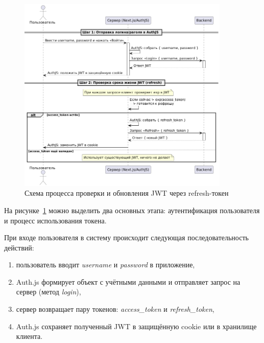 \begin{figure}[h]
    \centering
    \includegraphics[width=0.9\textwidth]{static/diagrams/AuthRefresh.png}
    \caption{Схема процесса проверки и обновления JWT через refresh-токен}
    \label{fig:auth-refresh}
\end{figure}

На рисунке~\ref{fig:auth-refresh} можно выделить два основных этапа: аутентификация пользователя и процесс использования токена.

При входе пользователя в систему происходит следующая последовательность действий:
\begin{enumerate}
    \item пользователь вводит \textit{username} и \textit{password} в приложение,
    \item Auth.js формирует объект с учётными данными и отправляет запрос на сервер (метод \textit{login}),
    \item сервер возвращает пару токенов: \textit{access\_token} и \textit{refresh\_token},
    \item Auth.js сохраняет полученный JWT в защищённую cookie или в хранилище клиента.
\end{enumerate}

